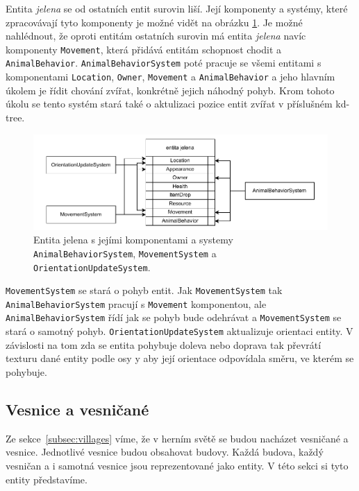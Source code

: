 Entita \textit{jelena} se od ostatních entit surovin liší. Její komponenty a systémy, které zpracovávají tyto komponenty je možné vidět na obrázku \ref{fig:deer}. Je možné nahlédnout, že oproti entitám ostatních surovin má entita \textit{jelena} navíc komponenty \texttt{Movement}, která přidává entitám schopnost chodit a \texttt{AnimalBehavior}. \texttt{AnimalBehaviorSystem} poté pracuje se všemi entitami s komponentami \texttt{Location}, \texttt{Owner}, \texttt{Movement} a \texttt{AnimalBehavior} a jeho hlavním úkolem je řídit chování zvířat, konkrétně jejich náhodný pohyb. Krom tohoto úkolu se tento systém stará také o aktulizaci pozice entit zvířat v příslušném kd-tree.

\begin{figure}[!htb]
  \centering
  \includegraphics[width=1.0\linewidth]{img/deer.pdf}
  \caption{Entita jelena s jejími komponentami a systemy \texttt{AnimalBehaviorSystem}, \texttt{MovementSystem} a \texttt{OrientationUpdateSystem}.}
  \label{fig:deer}
\end{figure}

\texttt{MovementSystem} se stará o pohyb entit. Jak \texttt{MovementSystem} tak \texttt{AnimalBehaviorSystem} pracují s \texttt{Movement} komponentou, ale \texttt{AnimalBehaviorSystem} řídí jak se pohyb bude odehrávat a \texttt{MovementSystem} se stará o samotný pohyb. \texttt{OrientationUpdateSystem} aktualizuje orientaci entity. V závislosti na tom zda se entita pohybuje doleva nebo doprava tak převrátí texturu dané entity podle osy y aby její orientace odpovídala směru, ve kterém se pohybuje.

\subsection{Vesnice a vesničané}
Ze sekce~\ref{subsec:villages} víme, že v herním světě se budou nacházet vesničané a vesnice. Jednotlivé vesnice budou obsahovat budovy. Každá budova, každý vesničan a i samotná vesnice jsou reprezentované jako entity. V této sekci si tyto entity představíme.

